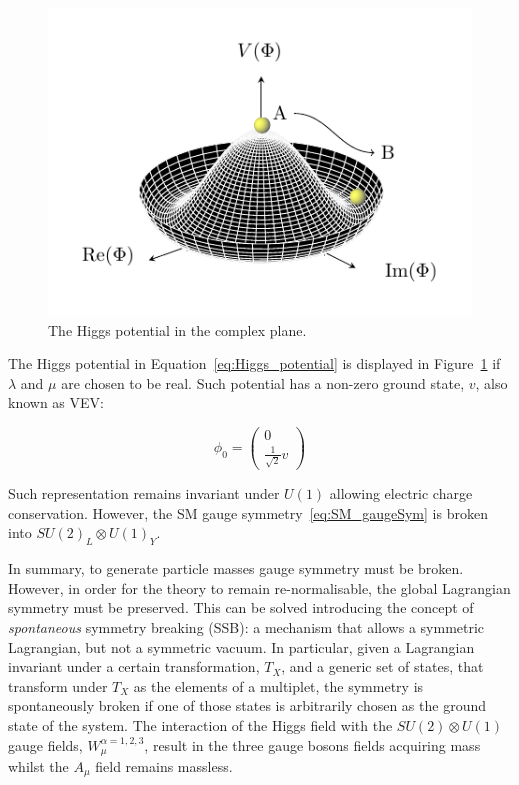 			\begin{figure}
				\centering
				\includegraphics[width=.4\textwidth]{HiggsPotential/HiggsPotential}
				\caption{\label{fig:higgs_potential}The Higgs potential in the complex plane.} %
			\end{figure}

			The Higgs potential in Equation~\ref{eq:Higgs_potential} is displayed in Figure~\ref{fig:higgs_potential} if $\lambda$ and $\mu$ are chosen to be real. Such potential has a non-zero ground state, $v$, also known as \ac{VEV}:

			\begin{equation}
			\label{eq:Higgs_vev}
				\phi_0 = 
				\begin{pmatrix}
					0 \\ \frac{1}{\sqrt{2}} v
				\end{pmatrix}
			\end{equation}

			\noindent Such representation remains invariant under $U(1)$ allowing electric charge conservation. However, the \ac{SM} gauge symmetry~\ref{eq:SM_gaugeSym} is broken into $SU(2)_L \otimes U(1)_Y$.

			In summary, to generate particle masses gauge symmetry must be broken. However, in order for the theory to remain re-normalisable, the global Lagrangian symmetry must be preserved. This can be solved introducing the concept of \emph{spontaneous} symmetry breaking (SSB): a mechanism that allows a symmetric Lagrangian, but not a symmetric vacuum. In particular, given a Lagrangian invariant under a certain transformation, $T_X$, and a generic set of states, that transform under $T_X$ as the elements of a multiplet, the symmetry is spontaneously broken if one of those states is arbitrarily chosen as the ground state of the system. 
			The interaction of the Higgs field with the $SU(2) \otimes U(1)$ gauge fields, $W_\mu^{\alpha =1,2,3}$, result in the three gauge bosons fields acquiring mass whilst the $A_\mu$ field remains massless. 



